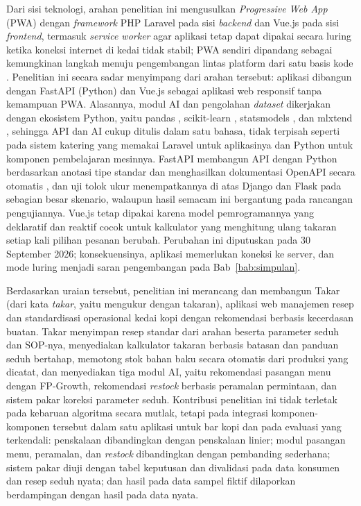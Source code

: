 Dari sisi teknologi, arahan penelitian ini mengusulkan \textit{Progressive Web App} (PWA) dengan \textit{framework} PHP Laravel \citep*{laravel2026installation} pada sisi \textit{backend} dan Vue.js pada sisi \textit{frontend}, termasuk \textit{service worker} agar aplikasi tetap dapat dipakai secara luring ketika koneksi internet di kedai tidak stabil; PWA sendiri dipandang sebagai kemungkinan langkah menuju pengembangan lintas platform dari satu basis kode \citep*{majchrzak2018progressive}. Penelitian ini secara sadar menyimpang dari arahan tersebut: aplikasi dibangun dengan FastAPI (Python) dan Vue.js sebagai aplikasi web responsif tanpa kemampuan PWA. Alasannya, modul AI dan pengolahan \textit{dataset} dikerjakan dengan ekosistem Python, yaitu pandas \citep*{mckinney2010data}, scikit-learn \citep{pedregosa2011scikitlearn}, statsmodels \citep*{seabold2010statsmodels}, dan mlxtend \citep*{raschka2018mlxtend}, sehingga API dan AI cukup ditulis dalam satu bahasa, tidak terpisah seperti pada sistem katering \citet*{pratama2026automatic} yang memakai Laravel untuk aplikasinya dan Python untuk komponen pembelajaran mesinnya. FastAPI membangun API dengan Python berdasarkan anotasi tipe standar dan menghasilkan dokumentasi OpenAPI secara otomatis \citep*{ramirez2026fastapi}, dan uji tolok ukur \citet*{bednarz2025benchmarking} menempatkannya di atas Django dan Flask pada sebagian besar skenario, walaupun hasil semacam ini bergantung pada rancangan pengujiannya. Vue.js tetap dipakai karena model pemrogramannya yang deklaratif dan reaktif \citep*{vuejs2026introduction} cocok untuk kalkulator yang menghitung ulang takaran setiap kali pilihan pesanan berubah. Perubahan ini diputuskan pada 30 September 2026; konsekuensinya, aplikasi memerlukan koneksi ke server, dan mode luring menjadi saran pengembangan pada Bab~\ref{bab:simpulan}.

Berdasarkan uraian tersebut, penelitian ini merancang dan membangun Takar (dari kata \emph{takar}, yaitu mengukur dengan takaran), aplikasi web manajemen resep dan standardisasi operasional kedai kopi dengan rekomendasi berbasis kecerdasan buatan. Takar menyimpan resep standar dari arahan beserta parameter seduh dan SOP-nya, menyediakan kalkulator takaran berbasis batasan dan panduan seduh bertahap, memotong stok bahan baku secara otomatis dari produksi yang dicatat, dan menyediakan tiga modul AI, yaitu rekomendasi pasangan menu dengan FP-Growth, rekomendasi \textit{restock} berbasis peramalan permintaan, dan sistem pakar koreksi parameter seduh. Kontribusi penelitian ini tidak terletak pada kebaruan algoritma secara mutlak, tetapi pada integrasi komponen-komponen tersebut dalam satu aplikasi untuk bar kopi dan pada evaluasi yang terkendali: penskalaan dibandingkan dengan penskalaan linier; modul pasangan menu, peramalan, dan \textit{restock} dibandingkan dengan pembanding sederhana; sistem pakar diuji dengan tabel keputusan dan divalidasi pada data konsumen dan resep seduh nyata; dan hasil pada data sampel fiktif dilaporkan berdampingan dengan hasil pada data nyata.

